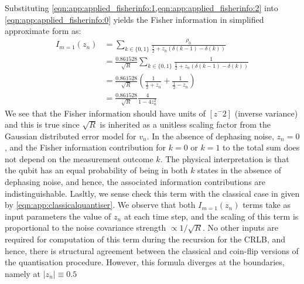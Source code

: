 Substituting \cref{eqn:app:applied_fisherinfo:1,eqn:app:applied_fisherinfo:2} into \cref{eqn:app:applied_fisherinfo:0} yields the Fisher information in simplified approximate form as:
\begin{align}
I_{m=1}(z_n) & = \sum_{k\in \{0, 1\}} \frac{\rho_0}{ \frac{1}{2} + z_n \left( \delta(k-1) - \delta(k) \right)}\\
& = \frac{0.861528}{\sqrt{R}} \sum_{k\in \{0, 1\}} \frac{1}{ \frac{1}{2} + z_n \left( \delta(k-1) - \delta(k) \right)} \\
& = \frac{0.861528}{\sqrt{R}} \left( \frac{1}{ \frac{1}{2} + z_n} + \frac{1}{ \frac{1}{2} - z_n} \right) \\
& = \frac{0.861528}{\sqrt{R}} \frac{4}{ 1 - 4z_n^2} \label{eqn:app:applied_fisherinfo:final}
\end{align}
We see that the Fisher information should have units of $[z^-2]$ (inverse variance) and this is true since $\sqrt{R}$ is inherited as a unitless scaling factor from the Gaussian distributed error model for $v_n$. In the absence of dephasing noise, $z_n=0$, and the Fisher information contribution for $k=0$ or $k=1$ to the total sum does not depend on the measurement outcome $k$. The physical interpretation is that the qubit has an equal probability of being in both $k$ states in the absence of dephasing noise, and hence, the associated information contributions are indistinguishable. Lasltly, we sense check this term with the classical case in \cite{karlsson2005} given by \cref{eqn:app:classicalquantiser}. We observe that both $I_{m=1}(z_n)$ terms take as input parameters the value of $z_n$ at each time step, and the scaling of this term is proportional to the noise covariance strength $\propto 1/\sqrt{R}$. No other inputs are required for computation of this term during the recursion for the CRLB, and hence, there is structural agreement between the classical and coin-flip versions of the quantisation procedure. However, this formula diverges at the boundaries, namely at $|z_n| \equiv 0.5$

